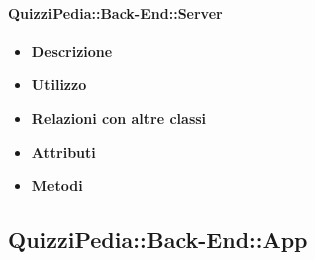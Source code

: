 	\paragraph{QuizziPedia::Back-End::Server}
	\begin{itemize}
		\item \textbf{Descrizione}
		\item \textbf{Utilizzo}
		\item \textbf{Relazioni con altre classi}
		\item \textbf{Attributi}
		\item \textbf{Metodi}
	\end{itemize}
	
\subsection{QuizziPedia::Back-End::App}
